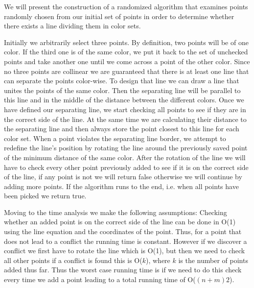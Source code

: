 We will present the construction of a randomized algorithm that examines points randomly chosen from our initial set of points in order to determine whether there exists a line dividing them in color sets. 

Initially we arbitrarily select three points. By definition, two points will be of one color. If the third one is of the same color, we put it back to the set of unchecked points and take another one until we come across a point of the other color. Since no three points are collinear we are guaranteed that there is at least one line that can separate the points color-wise. To design that line we can draw a line that unites the points of the same color. Then the separating line will be parallel to this line and in the middle of the distance between the different colors. Once we have defined our separating line, we start checking all points to see if they are in the correct side of the line. At the same time we are calculating their distance to the separating line and then always store the point closest to this line for each color set. When a point violates the separating line border, we attempt to redefine the line's position by rotating the line around the previously saved point of the minimum distance of the same color. After the rotation of the line we will have to check every other point previously added to see if it is on the correct side of the line, if any point is not we will return false otherwise we will continue by adding more points. If the algorithm runs to the end, i.e. when all points have been picked we return true.

Moving to the time analysis we make the following assumptions: Checking whether an added point is on the correct side of the line can be done in O(1) using the line equation and the coordinates of the point. Thus, for a point that does not lead to a conflict the running time is constant. However if we discover a conflict we first have to rotate the line which is O(1), but then we need to check all other points if a conflict is found this is O($k$), where $k$ is the number of points added thus far. Thus the worst case running time is if we need to do this check every time we add a point leading to a total running time of O($(n + m)2$). 

